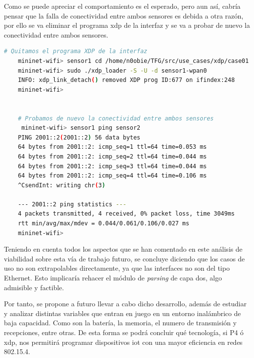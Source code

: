 \newpage

 Como se puede apreciar el comportamiento es el esperado, pero aun así, cabría pensar que la falla de conectividad entre ambos sensores es debida a otra razón, por ello se va eliminar el programa \gls{xdp} de la interfaz y se va a probar de nuevo la conectividad entre ambos sensores.
\begin{lstlisting}[language= bash, style=Consola, caption={Comprobación de funcionamiento del programa XDP - 2},label=code:futureW_func26]
    # Quitamos el programa XDP de la interfaz 
    mininet-wifi> sensor1 cd /home/n0obie/TFG/src/use_cases/xdp/case01 
    mininet-wifi> sudo ./xdp_loader -S -U -d sensor1-wpan0
    INFO: xdp_link_detach() removed XDP prog ID:677 on ifindex:248
    mininet-wifi>
    
    
    # Probamos de nuevo la conectividad entre ambos sensores
     mininet-wifi> sensor1 ping sensor2
    PING 2001::2(2001::2) 56 data bytes
    64 bytes from 2001::2: icmp_seq=1 ttl=64 time=0.053 ms
    64 bytes from 2001::2: icmp_seq=2 ttl=64 time=0.044 ms
    64 bytes from 2001::2: icmp_seq=3 ttl=64 time=0.044 ms
    64 bytes from 2001::2: icmp_seq=4 ttl=64 time=0.106 ms
    ^CsendInt: writing chr(3)
    
    --- 2001::2 ping statistics ---
    4 packets transmitted, 4 received, 0% packet loss, time 3049ms
    rtt min/avg/max/mdev = 0.044/0.061/0.106/0.027 ms
    mininet-wifi>

\end{lstlisting}

\vspace{0.5cm}

 Teniendo en cuenta todos los aspectos que se han comentado en este análisis de viabilidad sobre esta vía de trabajo futuro, se concluye diciendo que los casos de uso no son extrapolables directamente, ya que las interfaces no son del tipo Ethernet. Esto implicaría rehacer el módulo de \textit{parsing} de capa dos, algo admisible y factible. \\
\par

 Por tanto, se propone a futuro llevar a cabo dicho desarrollo, además de estudiar y analizar distintas variables que entran en juego en un entorno inalámbrico de baja capacidad. Como son la batería, la memoria, el numero de transmisión y recepciones, entre otras. De esta forma se podrá concluir qué tecnología, si P4 ó \gls{xdp}, nos permitirá programar dispositivos \gls{iot} con una mayor eficiencia en redes 802.15.4.


